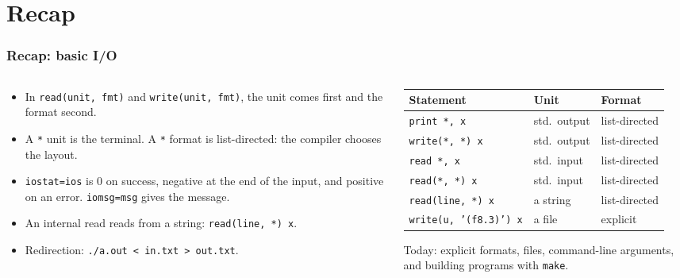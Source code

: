 
\subtitle{Lecture 7: Formatted and File I/O, and Makefiles}



\begin{frame}
  \titlepage
\end{frame}

\section{Recap}

\begin{frame}[fragile]
  \frametitle{Recap: basic I/O}
  \begin{columns}[T]
    \begin{column}{0.45\textwidth}
      \begin{itemize}
        \item In \texttt{read(unit, fmt)} and \texttt{write(unit, fmt)}, the unit comes first and the format second.
        \item A \texttt{*} unit is the terminal. A \texttt{*} format is list-directed: the compiler chooses the layout.
        \item \texttt{iostat=ios} is 0 on success, negative at the end of the input, and positive on an error. \texttt{iomsg=msg} gives the message.
        \item An internal read reads from a string: \texttt{read(line, *) x}.
        \item Redirection: \mbox{\texttt{./a.out < in.txt > out.txt}}.
      \end{itemize}
    \end{column}

    \begin{column}{0.55\textwidth}
      \vspace*{2mm}
      \centering
      \footnotesize
      \begin{tabular}{lll}
        \textbf{Statement} & \textbf{Unit} & \textbf{Format} \\
        \hline
        \texttt{print *, x}           & std.\ output & list-directed \\
        \texttt{write(*, *) x}        & std.\ output & list-directed \\
        \texttt{read *, x}            & std.\ input  & list-directed \\
        \texttt{read(*, *) x}         & std.\ input  & list-directed \\
        \texttt{read(line, *) x}      & a string     & list-directed \\
        \hline
        \texttt{write(u, '(f8.3)') x} & a file       & explicit \\
      \end{tabular}

      \vspace*{4mm}
      \normalsize
      \raggedright
      Today: explicit formats, files, command-line arguments, and building programs with \texttt{make}.
    \end{column}
  \end{columns}
\end{frame}


